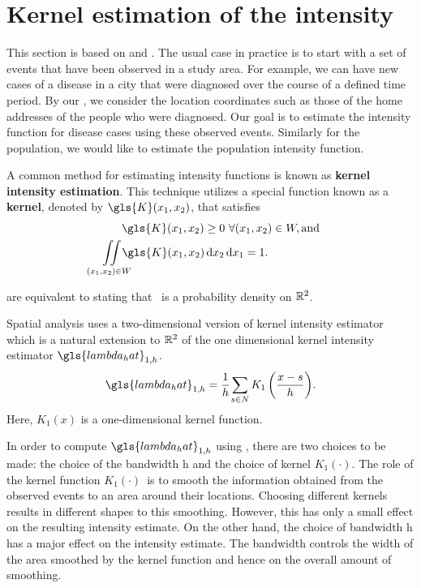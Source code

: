 \section{Kernel estimation of the intensity}
\label{sec:theory:kernelestimation}

This section is based on \citet{silverman1986density} and \citet{wand1994kernel}.
The usual case in practice is to start with a set of \glspl{event} that have been observed in a study area.
For example, we can have new cases of a disease in a city that were diagnosed over the course of a defined time period.
By our ,
we consider the location coordinates such as those of the home addresses of the people who were diagnosed.
Our goal is to estimate the \gls{intensity} function for disease cases using these observed \glspl{event}.
Similarly for the population,
we would like to estimate the population \gls{intensity} function.

A common method for estimating \gls{intensity} functions is known as
\textbf{\gls{kernel intensity estimation}}.
This technique utilizes a special function known as a \textbf{\gls{kernel}},
denoted by $\gls{K}\xvec$,
that satisfies
\begin{align}
    & \hspace{1.75em} \gls{K}\xvec \ge 0~ \forall \xvec \in W, \text{and} \label{eq:k_pos} \\%
    & \iintW{\gls{K}\xvec} = 1 \label{eq:k_1} \text{.}%
\end{align}

 are equivalent to stating that \Kdots~is a probability density on $\mathbb{R}^2$.

Spatial analysis uses a two-dimensional version of \gls{kernel intensity estimator}
which is a natural extension to $\mathbb{R}^2$ of the one dimensional \gls{kernel intensity estimator} $\gls{lambda_hat}_{1,h}$.
\begin{equation}
    \label{eq:lambda_hat_1}
    \gls{lambda_hat}_{1,h} = \sumSone{K_1\left( \frac{x - s}{h} \right)} \text{.}%
\end{equation}
Here, $K_1(x)$ is a one-dimensional kernel function.

In order to compute $\gls{lambda_hat}_{1,h}$ using ,
there are two choices to be made: the choice of the bandwidth \gls{h}
and the choice of \gls{kernel} $K_1(\cdot)$.
The role of the \gls{kernel} function $K_1(\cdot)$~is to smooth the information obtained
from the observed \glspl{event} to an area around their locations.
Choosing different \glspl{kernel} results in different shapes to this smoothing.
However, this has only a small effect on the resulting \gls{intensity} estimate.
On the other hand,
the choice of bandwidth \gls{h} has a major effect on the \gls{intensity} estimate.
The bandwidth controls the width of the area smoothed by the \gls{kernel} function and hence on the overall amount of smoothing.

